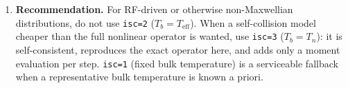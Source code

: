 \documentclass[11pt,a4paper]{article}
\begin{document}
\begin{enumerate}
  \item \textbf{Recommendation.} For RF-driven or otherwise non-Maxwellian
        distributions, do not use \texttt{isc=2} ($T_b = T_\text{eff}$). When a
        self-collision model cheaper than the full nonlinear operator is
        wanted, use \texttt{isc=3} ($T_b = T_n$): it is self-consistent,
        reproduces the exact operator here, and adds only a moment evaluation
        per step. \texttt{isc=1} (fixed bulk temperature) is a serviceable
        fallback when a representative bulk temperature is known a priori.
\end{enumerate}
\end{document}
